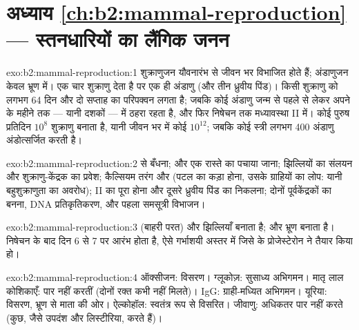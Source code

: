 \section*{अध्याय \ref{ch:b2:mammal-reproduction} --- स्तनधारियों का लैंगिक जनन}

\begin{solution}{exo:b2:mammal-reproduction:1}
शुक्राणुजन यौवनारंभ से जीवन भर विभाजित होते हैं; अंडाणुजन केवल
भ्रूण में। एक  चार शुक्राणु देता है पर एक ही अंडाणु (और
तीन ध्रुवीय पिंड)। किसी शुक्राणु को लगभग 64 दिन और दो सप्ताह का परिपक्वन
लगता है; जबकि कोई अंडाणु जन्म से पहले से लेकर अपने  के महीने तक
--- यानी दशकों ---  में ठहरा रहता है, और फिर निषेचन तक
मध्यावस्था II में। कोई पुरुष प्रतिदिन $10^{8}$ शुक्राणु बनाता है, यानी
जीवन भर में कोई $10^{12}$; जबकि कोई स्त्री लगभग 400 अंडाणु अंडोत्सर्जित करती है।
\end{solution}

\begin{solution}{exo:b2:mammal-reproduction:2}
 से बँधना;  और एक रास्ते का
पचाया जाना; झिल्लियों का संलयन और शुक्राणु-केंद्रक का प्रवेश;
कैल्सियम तरंग और  (पटल का कड़ा होना, उसके
ग्राहियों का लोप: यानी बहुशुक्राणुता का अवरोध);  II का
पूरा होना और दूसरे ध्रुवीय पिंड का निकलना; दोनों पूर्वकेंद्रकों का बनना,
DNA प्रतिकृतिकरण, और पहला समसूत्री विभाजन।
\end{solution}

\begin{solution}{exo:b2:mammal-reproduction:3}
 (बाहरी परत)  और झिल्लियाँ बनाता है; और
 भ्रूण बनाता है।  निषेचन के बाद दिन 6 से 7
पर आरंभ होता है, ऐसे गर्भाशयी अस्तर में जिसे  के
प्रोजेस्टेरोन ने तैयार किया हो।
\end{solution}

\begin{solution}{exo:b2:mammal-reproduction:4}
ऑक्सीजन: विसरण। ग्लूकोज़: सुसाध्य अभिगमन। मातृ लाल
कोशिकाएँ: पार नहीं करतीं (दोनों रक्त कभी नहीं मिलते)। IgG: ग्राही-मध्यित
अभिगमन। यूरिया: विसरण, भ्रूण से माता की ओर। ऐल्कोहॉल: स्वतंत्र रूप से
विसरित। जीवाणु: अधिकतर पार नहीं करते (कुछ, जैसे उपदंश और
लिस्टीरिया, करते हैं)।
\end{solution}

